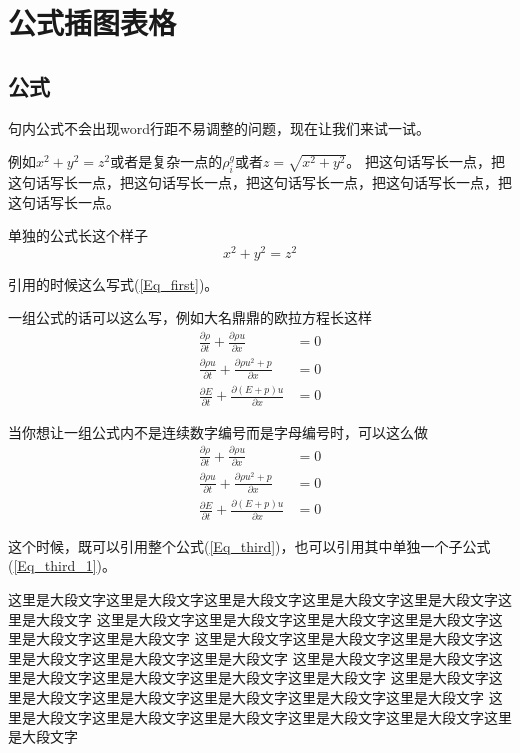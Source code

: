 \chapter{公式插图表格}
\section{公式}
句内公式不会出现word行距不易调整的问题，现在让我们来试一试。

例如$x^2 + y^2 = z^2$或者是复杂一点的$\rho^g_i$或者$z=\sqrt{x^2 + y^2}$。
把这句话写长一点，把这句话写长一点，把这句话写长一点，把这句话写长一点，把这句话写长一点，把这句话写长一点。

单独的公式长这个样子
\begin{equation}\label{Eq_first}
	x^2 + y^2 = z^2
\end{equation}

引用的时候这么写式(\ref{Eq_first})。

一组公式的话可以这么写，例如大名鼎鼎的欧拉方程长这样
\begin{align}
	\frac{\partial \rho}{\partial t} + \frac{\partial \rho u}{\partial x} &= 0\label{Eq_second_1}\\
	\frac{\partial \rho u}{\partial t} + \frac{\partial \rho u^2 + p}{\partial x} &= 0\label{Eq_second_2}\\
	\frac{\partial E}{\partial t} + \frac{\partial (E +p) u}{\partial x} &= 0\label{Eq_second_3}
\end{align}

当你想让一组公式内不是连续数字编号而是字母编号时，可以这么做
\begin{subequations}
	\label{Eq_third}
	\begin{align}
		\frac{\partial \rho}{\partial t} + \frac{\partial \rho u}{\partial x} &= 0\label{Eq_third_1}\\
		\frac{\partial \rho u}{\partial t} + \frac{\partial \rho u^2 + p}{\partial x} &= 0\label{Eq_third_2}\\
		\frac{\partial E}{\partial t} + \frac{\partial (E +p) u}{\partial x} &= 0\label{Eq_third_3}
	\end{align}
\end{subequations}

这个时候，既可以引用整个公式(\ref{Eq_third})，也可以引用其中单独一个子公式(\ref{Eq_third_1})。

这里是大段文字这里是大段文字这里是大段文字这里是大段文字这里是大段文字这里是大段文字
这里是大段文字这里是大段文字这里是大段文字这里是大段文字这里是大段文字这里是大段文字
这里是大段文字这里是大段文字这里是大段文字这里是大段文字这里是大段文字这里是大段文字
这里是大段文字这里是大段文字这里是大段文字这里是大段文字这里是大段文字这里是大段文字
这里是大段文字这里是大段文字这里是大段文字这里是大段文字这里是大段文字这里是大段文字
这里是大段文字这里是大段文字这里是大段文字这里是大段文字这里是大段文字这里是大段文字

